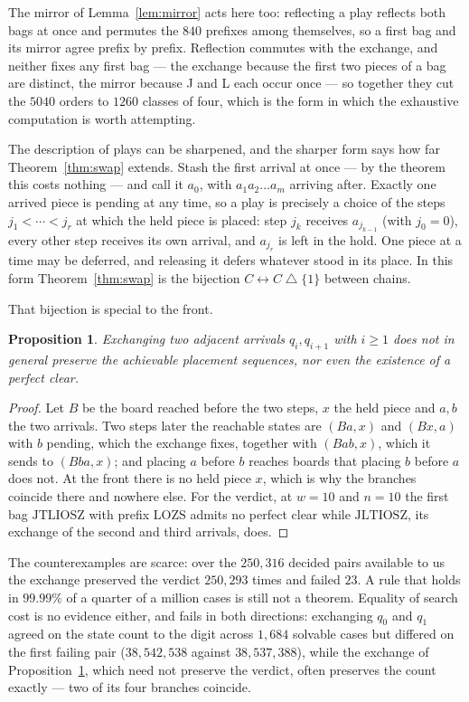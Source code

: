 \documentclass[11pt,a4paper]{article}
\theoremstyle{plain}
\newtheorem{proposition}[theorem]{Proposition}
\theoremstyle{definition}
\theoremstyle{remark}
\begin{document}
The mirror of Lemma~\ref{lem:mirror} acts here too: reflecting a play reflects both
bags at once and permutes the $840$ prefixes among themselves, so a first bag and its
mirror agree prefix by prefix. Reflection commutes with the exchange, and neither
fixes any first bag --- the exchange because the first two pieces of a bag are
distinct, the mirror because J and L each occur once --- so together they cut the
$5040$ orders to $1260$ classes of four, which is the form in which the exhaustive
computation is worth attempting.

The description of plays can be sharpened, and the sharper form says how far
Theorem~\ref{thm:swap} extends. Stash the first arrival at once --- by the theorem
this costs nothing --- and call it $a_0$, with $a_1 a_2 \ldots a_m$ arriving after.
Exactly one arrived piece is pending at any time, so a play is precisely a choice of
the steps $j_1 < \cdots < j_r$ at which the held piece is placed: step $j_k$ receives
$a_{j_{k-1}}$ (with $j_0 = 0$), every other step receives its own arrival, and
$a_{j_r}$ is left in the hold. One piece at a time may be deferred, and releasing it
defers whatever stood in its place. In this form Theorem~\ref{thm:swap} is the
bijection $C \leftrightarrow C \bigtriangleup \{1\}$ between chains.

That bijection is special to the front.

\begin{proposition}
\label{prop:adjacent}
Exchanging two adjacent arrivals $q_i, q_{i+1}$ with $i \geq 1$ does not in general
preserve the achievable placement sequences, nor even the existence of a perfect clear.
\end{proposition}

\begin{proof}
Let $B$ be the board reached before the two steps, $x$ the held piece and $a, b$ the
two arrivals. Two steps later the reachable states are $(Ba, x)$ and $(Bx, a)$ with
$b$ pending, which the exchange fixes, together with $(Bab, x)$, which it sends to
$(Bba, x)$; and placing $a$ before $b$ reaches boards that placing $b$ before $a$ does
not. At the front there is no held piece $x$, which is why the branches coincide there
and nowhere else. For the verdict, at $w = 10$ and $n = 10$ the first bag
$\mathrm{JTLIOSZ}$ with prefix $\mathrm{LOZS}$ admits no perfect clear while
$\mathrm{JLTIOSZ}$, its exchange of the second and third arrivals, does.
\end{proof}

The counterexamples are scarce: over the $250{,}316$ decided pairs available to us the
exchange preserved the verdict $250{,}293$ times and failed $23$. A rule that holds in
$99.99\%$ of a quarter of a million cases is still not a theorem. Equality of search
cost is no evidence either, and fails in both directions: exchanging $q_0$ and $q_1$
agreed on the state count to the digit across $1{,}684$ solvable cases but differed on
the first failing pair ($38{,}542{,}538$ against $38{,}537{,}388$), while the exchange
of Proposition~\ref{prop:adjacent}, which need not preserve the verdict, often
preserves the count exactly --- two of its four branches coincide.
\end{document}
